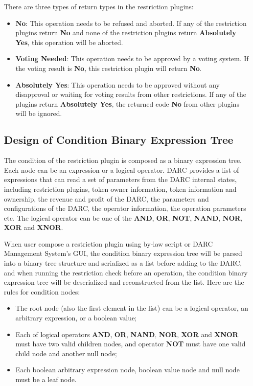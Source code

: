 \documentclass[main.tex]{subfiles}
\begin{document}
There are three types of return types in the restriction plugins:
\begin{itemize}
\item \textbf{No}: This operation needs to be refused and aborted. If any of the restriction plugins return \textbf{No} and none of the restriction plugins return \textbf{Absolutely Yes}, this operation will be aborted.
\item \textbf{Voting Needed}: This operation needs to be approved by a voting system. If the voting result is \textbf{No}, this restriction plugin will return \textbf{No}.
\item \textbf{Absolutely Yes}: This operation needs to be approved without any disapproval or waiting for voting results from other restrictions. If any of the plugins return \textbf{Absolutely Yes}, the returned code \textbf{No} from other plugins will be ignored.
\end{itemize}




\subsection{Design of Condition Binary Expression Tree}

The condition of the restriction plugin is composed as a binary expression tree. Each node can be an expression or a logical operator. DARC provides a list of expressions that can read a set of parameters from the DARC internal states, including restriction plugins, token owner information, token information and ownership, the revenue and profit of the DARC, the parameters and configurations of the DARC, the operator information, the operation parameters etc. The logical operator can be one of the \textbf{AND}, \textbf{OR}, \textbf{NOT}, \textbf{NAND}, \textbf{NOR}, \textbf{XOR} and \textbf{XNOR}.

When user compose a restriction plugin using by-law script or DARC Management System's GUI, the condition binary expression tree will be parsed into a binary tree structure and serialized as a list before adding to the DARC, and when running the restriction check before an operation, the condition binary expression tree will be deserialized and reconstructed from the list. Here are the rules for condition nodes:

\begin{itemize}
    \item The root node (also the first element in the list) can be a logical operator, an arbitrary expression, or a boolean value;
    \item Each of logical operators \textbf{AND}, \textbf{OR}, \textbf{NAND}, \textbf{NOR}, \textbf{XOR} and \textbf{XNOR} must have two valid children nodes, and operator \textbf{NOT} must have one valid child node and another null node;
    \item Each boolean arbitrary expression node, boolean value node and null node must be a leaf node.
\end{itemize}
\end{document}
